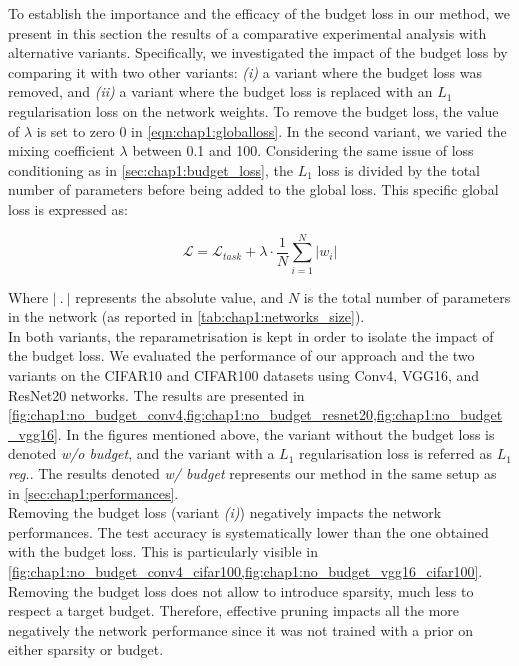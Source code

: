 
To establish the importance and the efficacy of the budget loss in our method,
we present in this section the results of a comparative experimental analysis
with alternative variants.  Specifically, we investigated the impact of the
budget loss by comparing it with two other variants: \emph{(i)} a variant where the
budget loss was removed, and \emph{(ii)} a variant where the budget loss is replaced
with an $L_1$ regularisation loss on the network weights. To remove the budget
loss, the value of $\lambda$ is set to zero 0 in \cref{eqn:chap1:globalloss}. In the
second variant, we varied the mixing coefficient $\lambda$ between 0.1 and 100.
Considering the same issue of loss conditioning as in
\cref{sec:chap1:budget_loss}, the $L_1$ loss is divided by the total number of
parameters before being added to the global loss. This specific global loss is
expressed as:

\begin{equation}
  \label{eqn:chap1:globalloss_l1}
  \mathcal{L} = \mathcal{L}_{task} + \lambda \cdot \frac{1}{N} \sum_{i=1}^{N} \left| w_i \right|
\end{equation}

Where $|~.~|$ represents the absolute value, and $N$ is the total number of
parameters in the network (as reported in \cref{tab:chap1:networks_size}).\\

In both variants, the reparametrisation is kept in order to isolate the impact
of the budget loss. We evaluated the performance of our approach and the two
variants on the CIFAR10 and CIFAR100 datasets using Conv4, VGG16, and ResNet20
networks. The results are presented in
\cref{fig:chap1:no_budget_conv4,fig:chap1:no_budget_resnet20,fig:chap1:no_budget_vgg16}.
In the figures mentioned above, the variant without the budget loss is denoted
\emph{w/o budget}, and the variant with a $L_1$ regularisation loss is referred
as \emph{$L_1$ reg.}. The results denoted \emph{w/ budget} represents our method
in the same setup as in \cref{sec:chap1:performances}.\\

Removing the budget loss (variant \emph{(i)}) negatively impacts the network
performances. The test accuracy is systematically lower than the one obtained
with the budget loss. This is particularly visible in
\cref{fig:chap1:no_budget_conv4_cifar100,fig:chap1:no_budget_vgg16_cifar100}.
Removing the budget loss does not allow to introduce sparsity, much less to
respect a target budget. Therefore, effective pruning impacts all the more
negatively the network performance since it was not trained with a prior on
either sparsity or budget. \\


